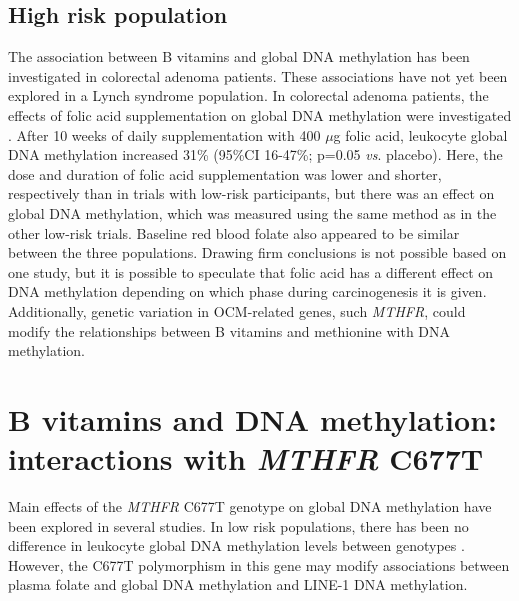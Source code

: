 \subsection{High risk population} %
\noindent The association between B vitamins and global DNA methylation has been investigated in colorectal adenoma patients. These associations have not yet been explored in a Lynch syndrome population. In colorectal adenoma patients, the effects of folic acid supplementation on global DNA methylation were investigated \cite{c1117}. After 10 weeks of daily supplementation with 400 $\mu$g folic acid, leukocyte global DNA methylation increased 31\% (95\%CI 16-47\%; p=0.05 \textit{vs}. placebo). Here, the dose and duration of folic acid supplementation was lower and shorter, respectively than in trials with low-risk participants, but there was an effect on global DNA methylation, which was measured using the same method as in the other low-risk trials. Baseline red blood folate also appeared to be similar between the three populations. Drawing firm conclusions is not possible based on one study, but it is possible to speculate that folic acid has a different effect on DNA methylation depending on which phase 
during 
carcinogenesis it is given. Additionally, genetic variation in OCM-related genes, such \textit{MTHFR}, could modify the relationships between B vitamins and methionine with DNA methylation. 
 
\section[]{B vitamins and DNA methylation: interactions with \emph{MTHFR} C677T} %
\noindent Main effects of the \textit{MTHFR} C677T genotype on global DNA methylation have been explored in several studies. In low risk populations, there has been no difference in leukocyte global DNA methylation levels between genotypes \cite{c1112,c1113,c1114}. However, the C677T polymorphism in this gene may modify associations between plasma folate and global DNA methylation and LINE-1 DNA methylation. 
 
